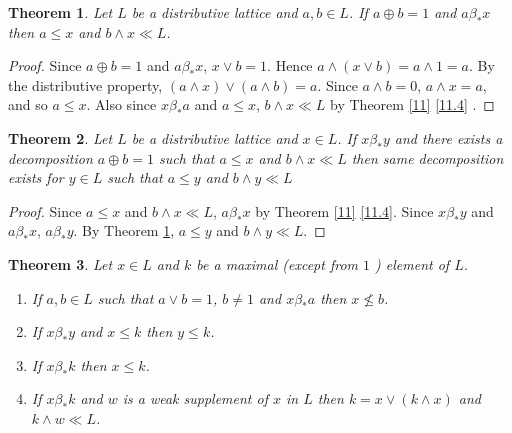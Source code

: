 \documentclass[a4paper,12pt]{article}
\newtheorem{theorem}{Theorem}[section]
\numberwithin{equation}{section}
\begin{document}
\begin{theorem}\label{12}
  Let $ L $ be a distributive lattice and $ a,b \in L $. If $ a \oplus b = 1 $ and $ a \beta_* x $ 
  then $ a \leq x $ and $ b \wedge x \ll L $.
\end{theorem}
\begin{proof}
  Since $ a \oplus b = 1 $ and $ a \beta_* x $, $ x \vee b = 1 $. Hence $ a \wedge ( x \vee b ) = a \wedge 1 = a $. 
  By the distributive property, $ ( a \wedge x ) \vee ( a \wedge b ) = a $. Since $ a \wedge b = 0 $, 
  $ a \wedge x = a $, and so $ a \leq x $. Also since $ x \beta_* a $ and $ a \leq x $, 
  $ b \wedge x \ll L $ by Theorem \ref{11} \ref{11.4} .
\end{proof}


\begin{theorem}\label{13}
  Let $ L $ be a distributive lattice and $ x \in L $. If $ x \beta_* y $ and there exists a 
  decomposition $ a \oplus b = 1 $ such that $ a \leq x $ and $ b \wedge x \ll L $ then same 
  decomposition exists for $ y \in L $ such that $ a \leq y $ and $ b \wedge y \ll L $
\end{theorem}
\begin{proof}
  Since $ a \leq x $ and $ b \wedge x \ll L $, $ a \beta_* x $ by Theorem \ref{11} \ref{11.4}. 
  Since $ x \beta_* y $ and $ a \beta_* x $, $ a \beta_* y $. 
  By Theorem \ref{12}, $ a \leq y $ and $ b \wedge y \ll L $.
\end{proof}

%
%
%
%
%
%

\begin{theorem}\label{14}
  Let $ x \in L $ and $ k $ be a maximal (except from $ 1 $ ) element of $ L $.
  \begin{enumerate}[label=(\roman{*}), ref=(\roman{*})]
    \item
      If $ a, b \in L $ such that $ a \vee b = 1 $, $ b \neq 1 $ and $ x \beta_* a $ then $ x \not\leq b $. \label{14.1}
      \label{14.1}
    \item
      If $ x \beta_*y $ and $ x \leq k $ then $ y \leq k $. \label{14.2}
    \item
      If $ x \beta_* k $ then $ x \leq k $. \label{14.3}
    \item
      If $ x \beta_* k $ and $ w $ is a weak supplement of $ x $ in $ L $ then $ k = x \vee ( k \wedge x ) $ 
      and  $ k \wedge w \ll L $. \label{14.4}
  \end{enumerate}
\end{theorem}
\end{document}
